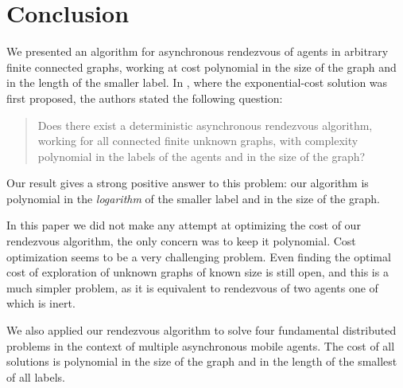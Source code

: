\documentclass [11pt] {article}
\begin{document}
\section{Conclusion}

We presented an algorithm for asynchronous rendezvous of agents in arbitrary finite connected graphs, working at cost polynomial in the size  of the graph and in the length
of the smaller label. In \cite{CLP}, where the exponential-cost solution was first proposed, the authors stated the following question:
\begin{quotation}
Does there exist a deterministic asynchronous rendezvous algorithm,
working for all connected finite unknown graphs,
with complexity polynomial in the labels of the agents and in the
size of the graph?
\end{quotation}
Our result gives a strong positive answer to this problem: our algorithm is polynomial in the {\em logarithm} of the smaller label and in the size of the graph.

In this paper we did not make any attempt at optimizing the cost of our rendezvous algorithm, the only concern was to keep it polynomial. Cost optimization seems to be a very challenging problem. Even finding the optimal cost of exploration of unknown graphs of known size is still open, and this is a much simpler problem, as it is equivalent to rendezvous of two agents one of which is inert. 

We also applied our rendezvous algorithm to solve four fundamental distributed problems in the context of multiple asynchronous mobile agents.
The cost of all solutions is polynomial in the size of the graph and in the length of the smallest of all labels. 
\end{document}
